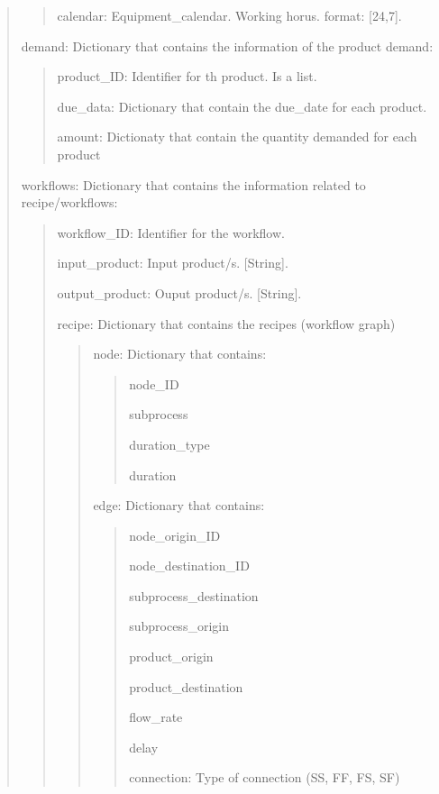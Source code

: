 \documentclass[letterpaper,10pt,english]{sphinxmanual}
\begin{document}
\begin{fulllineitems}
\begin{quote}
\begin{description}
\begin{quote}
\sphinxAtStartPar
calendar: Equipment\_calendar. Working horus. format: {[}24,7{]}.
\end{quote}

\sphinxAtStartPar
demand: Dictionary that contains the information of the product demand:
\begin{quote}

\sphinxAtStartPar
product\_ID: Identifier for th product. Is a list.

\sphinxAtStartPar
due\_data:   Dictionary that contain the due\_date for each product.

\sphinxAtStartPar
amount: Dictionaty that contain the quantity demanded for each product
\end{quote}

\sphinxAtStartPar
workflows: Dictionary that contains the information related to recipe/workflows:
\begin{quote}

\sphinxAtStartPar
workflow\_ID:    Identifier for the workflow.

\sphinxAtStartPar
input\_product:  Input product/s. {[}String{]}.

\sphinxAtStartPar
output\_product: Ouput product/s. {[}String{]}.

\sphinxAtStartPar
recipe: Dictionary that contains the recipes (workflow graph)
\begin{quote}

\sphinxAtStartPar
node: Dictionary that contains:
\begin{quote}

\sphinxAtStartPar
node\_ID

\sphinxAtStartPar
subprocess

\sphinxAtStartPar
duration\_type

\sphinxAtStartPar
duration
\end{quote}

\sphinxAtStartPar
edge:   Dictionary that contains:
\begin{quote}

\sphinxAtStartPar
node\_origin\_ID

\sphinxAtStartPar
node\_destination\_ID

\sphinxAtStartPar
subprocess\_destination

\sphinxAtStartPar
subprocess\_origin

\sphinxAtStartPar
product\_origin

\sphinxAtStartPar
product\_destination

\sphinxAtStartPar
flow\_rate

\sphinxAtStartPar
delay

\sphinxAtStartPar
connection: Type of connection (SS, FF, FS, SF)
\end{quote}
\end{quote}
\end{quote}

\end{description}
\end{quote}

\end{fulllineitems}
\end{document}

